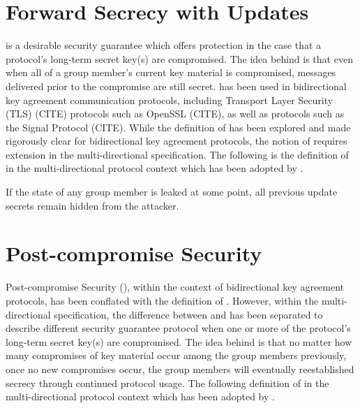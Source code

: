 \hypertarget{forward-secrecy-with-updates}{%
\section{Forward Secrecy with Updates}\label{forward-secrecy-with-updates}}

 is a desirable security guarantee which offers protection in the case that a protocol's long-term secret key(s) are compromised.
The idea behind  is that even when all of a group member's current key material is compromised, messages delivered prior to the compromise are still secret.
 has been used in bidirectional key agreement communication protocols, including Transport Layer Security (TLS) (CITE) protocols such as OpenSSL (CITE), as well as  protocols such as the Signal Protocol (CITE).
While the definition of  has been explored and made rigorously clear for bidirectional key agreement protocols, the notion of  requires extension in the multi-directional  specification.
The following is the definition of  in the multi-directional protocol context \autocite{alwen2020security} which has been adopted by .

\begin{definition}
If the state of any group member is leaked at some point, all previous update secrets remain hidden from the attacker.
\end{definition}


\hypertarget{post-compromise-security}{%
\section{Post-compromise Security}\label{post-compromise-security}}

Post-compromise Security (), within the context of bidirectional key agreement protocols, has been conflated with the definition of .
However, within the multi-directional  specification, the difference between  and  has been separated to describe different security guarantee protocol when one or more of the protocol's long-term secret key(s) are compromised.
The idea behind  is that no matter how many compromises of key material occur among the group members previously, once no new compromises occur, the group members will eventually reestablished secrecy through continued protocol usage.
The following definition of  in the multi-directional protocol context \autocite{alwen2020security} which has been adopted by .

